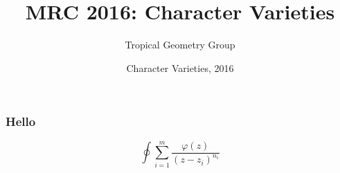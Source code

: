 \documentclass{beamer}
\begin{document}
\title[Crisis] %
{MRC 2016: Character Varieties}
\subtitle{Tropical Geometry Group}
\author[]{}
\date[MRC 2016] %
{Character Varieties, 2016}
\subject{Character varieties}
\frame{\titlepage}

\begin{frame}
  \frametitle{Hello}
  \[
    \oint\sum_{i=1}^m\frac{\varphi(z)}{(z-z_i)^{n_i}}
  \]
\end{frame}
\end{document}
